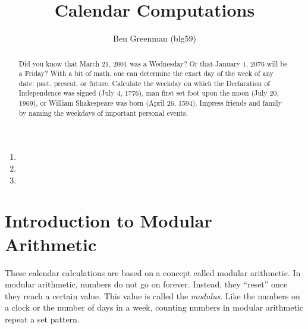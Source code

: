\documentclass{article}
\begin{document}
  \title{Calendar Computations}
  \date{}
  \author{Ben Greenman (blg59)}
  \maketitle
  \onehalfspacing

  \renewcommand{\abstractname}{}%
  \begin{abstract}
  \large
    Did you know that March 21, 2001 was a Wednesday? Or that January 1, 2076 will be a Friday?
    With a bit of math, one can determine the exact day of the week of any date: 
    past, present, or future. 
    Calculate the weekday on which the Declaration of Independence was signed (July 4, 1776), 
    man first set foot upon the moon (July 20, 1969), 
    or William Shakespeare was born (April 26, 1594). 
    Impress friends and family by naming the weekdays of important personal events.
  \end{abstract}

  \begin{enumerate} \item[] \item[] \item[] \end{enumerate}

  \tableofcontents
\newpage
  \section{Introduction to Modular Arithmetic}
    These calendar calculations are based on a concept called modular arithmetic. 
    In modular arithmetic, numbers do not go on forever. 
    Instead, they “reset” once they reach a certain value. 
    This value is called the \emph{modulus}. 
    Like the numbers on a clock or the number of days in a week, counting numbers 
    in modular arithmetic repeat a set pattern.
\end{document}
